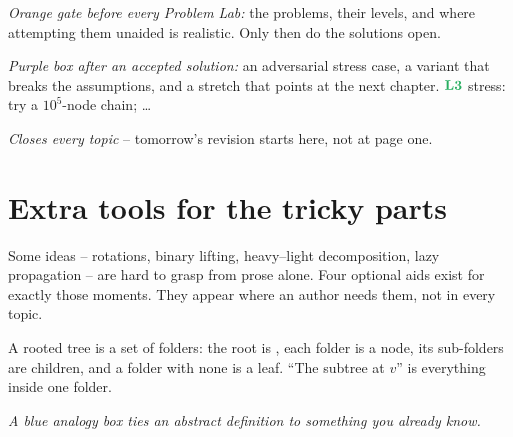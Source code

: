 \begin{attemptgate}
\emph{Orange gate before every Problem Lab:} the problems, their levels, and
where attempting them unaided is realistic. Only then do the solutions open.
\end{attemptgate}

\begin{thinkbox}
\end{thinkbox}

\begin{hardeningbox}
\emph{Purple box after an accepted solution:} an adversarial stress case, a
variant that breaks the assumptions, and a stretch that points at the next
chapter. $\lv3$ stress: try a $10^5$-node chain; \ldots
\end{hardeningbox}

\begin{recallbox}
\emph{Closes every topic} -- tomorrow's revision starts here, not at page one.
\end{recallbox}

\section*{Extra tools for the tricky parts}

Some ideas -- rotations, binary lifting, heavy--light decomposition, lazy propagation --
are hard to grasp from prose alone. Four optional aids exist for exactly those moments.
They appear where an author needs them, not in every topic.

\begin{analogybox}
A rooted tree is a set of folders: the root is \code{/}, each folder is a node, its
sub-folders are children, and a folder with none is a leaf. ``The subtree at $v$'' is
everything inside one folder.\par
\emph{A blue analogy box ties an abstract definition to something you already know.}
\end{analogybox}

